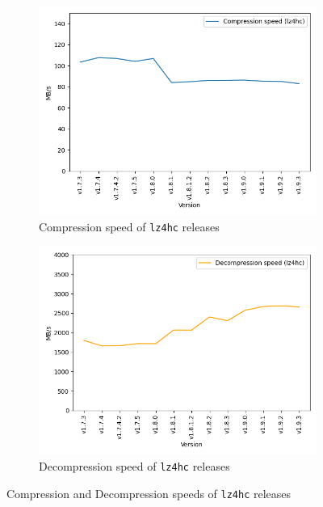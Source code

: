 \documentclass[	runningheads,
				a4paper]{llncs}
\begin{document}
	\begin{figure}[ht!]
		\centering
		\begin{subfigure}[b]{0.45\textwidth}
			\centering
			\includegraphics[width=\textwidth]{graph/lz4hc_release_compression}
			\caption{Compression speed of \texttt{lz4hc} releases}
		\end{subfigure}
		\begin{subfigure}[b]{0.45\textwidth}
			\centering
			\includegraphics[width=\textwidth]{graph/lz4hc_release_decompression}
			\caption{Decompression speed of \texttt{lz4hc} releases}
		\end{subfigure}
		\caption{Compression and Decompression speeds of \texttt{lz4hc} releases}
		\label{fig:release-bench-lz4hc}
	\end{figure}
\end{document}
